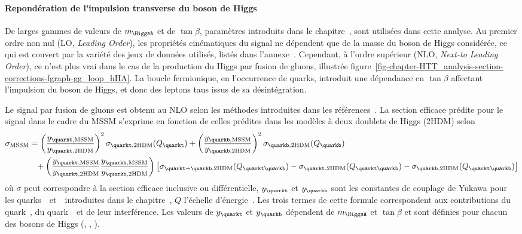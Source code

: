 \paragraph{Repondération de l'impulsion transverse du boson de Higgs}
De larges gammes de valeurs de $m_{\HiggsA}$ et de $\tan\beta$, paramètres introduits dans le chapitre~, sont utilisées dans cette analyse.
Au premier ordre non nul (LO, \emph{Leading Order}), les propriétés cinématiques du signal ne dépendent que de la masse du boson de Higgs considérée, ce qui est couvert par la variété des jeux de données utilisés, listés dans l'annexe~.
Cependant, à l'ordre supérieur (NLO, \emph{Next-to Leading Order}), ce n'est plus vrai dans le cas de la production du Higgs par fusion de gluons, illustrée figure~\ref{fig-chapter-HTT_analysis-section-corrections-fgraph-gg_loop_hHA}.
La boucle fermionique, en l'occurrence de quarks, introduit une dépendance en $\tan\beta$ affectant l'impulsion du boson de Higgs, et donc des leptons taus issus de sa désintégration.
\par
Le signal par fusion de gluons est obtenu au NLO selon les méthodes introduites dans les références~\cite{Bagnaschi:2015qta,Bagnaschi:2015bop}.
La section efficace prédite pour le signal dans le cadre du MSSM s'exprime en fonction de celles prédites dans les modèles à deux doublets de Higgs (2HDM) selon
\begin{align}
\sigma_\text{MSSM} &=
\left(\frac{y_{\quarkt,\text{MSSM}}}{y_{\quarkt,\text{2HDM}}}\right)^2 \sigma_{\quarkt,\text{2HDM}}(Q_{\quarkt})
+
\left(\frac{y_{\quarkb,\text{MSSM}}}{y_{\quarkb,\text{2HDM}}}\right)^2 \sigma_{\quarkb,\text{2HDM}}(Q_{\quarkb})
\nonumber\\&\hphantom{=}
+
\left(\frac{y_{\quarkt,\text{MSSM}}}{y_{\quarkt,\text{2HDM}}}\frac{y_{\quarkb,\text{MSSM}}}{y_{\quarkb,\text{2HDM}}}\right)
\left[ \sigma_{\quarkt+\quarkb,\text{2HDM}}(Q_{\quarkt\quarkb}) - \sigma_{\quarkt,\text{2HDM}}(Q_{\quarkt\quarkb}) - \sigma_{\quarkb,\text{2HDM}}(Q_{\quarkt\quarkb}) \right]
\label{eq-2HDM_to_MSSM_xsec}
\end{align}
où $\sigma$ peut correspondre à la section efficace inclusive ou différentielle,
$y_{\quarkt}$ et $y_{\quarkb}$ sont les constantes de couplage de Yukawa pour les quarks~\quarkt\ et~\quarkb\ introduites dans le chapitre~,
$Q$ l'échelle d'énergie~\cite{Bagnaschi:2015qta,Bagnaschi:2015bop}.
Les trois termes de cette formule correspondent aux contributions du quark~\quarkt, du quark~\quarkb\ et de leur interférence.
Les valeurs de $y_{\quarkt}$ et $y_{\quarkb}$ dépendent de $m_{\HiggsA}$ et $\tan\beta$ et sont définies pour chacun des bosons de Higgs (\higgs, \Higgs, \HiggsA).
